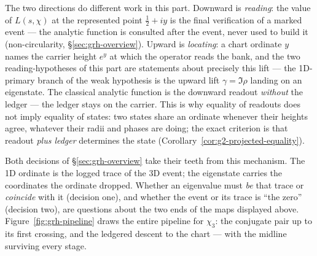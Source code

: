 The two directions do different work in this part. Downward is
\emph{reading}: the value of \(L(s,\chi)\) at the represented point
\(\tfrac12+iy\) is the final verification of a marked event --- the analytic
function is consulted after the event, never used to build it
(non-circularity, \S\ref{sec:grh-overview}). Upward is \emph{locating}: a
chart ordinate \(y\) names the carrier height \(e^{y}\) at which the operator
reads the bank, and the two reading-hypotheses of this part are statements
about precisely this lift --- the 1D-primary branch of the weak hypothesis is
the upward lift \(\gamma=\Im\rho\) landing on an eigenstate. The classical
analytic function is the downward readout \emph{without} the ledger --- the
ledger stays on the carrier. This is why equality of readouts does not imply
equality of states: two states share an ordinate whenever their heights
agree, whatever their radii and phases are doing; the exact criterion is that
readout \emph{plus ledger} determines the state
(Corollary~\ref{cor:g2-projected-equality}).

Both decisions of \S\ref{sec:grh-overview} take their teeth from this
mechanism. The 1D ordinate is the logged trace of the 3D event; the
eigenstate carries the coordinates the ordinate dropped. Whether an
eigenvalue must \emph{be} that trace or \emph{coincide} with it (decision
one), and whether the event or its trace is ``the zero'' (decision two), are
questions about the two ends of the maps displayed above.
Figure~\ref{fig:grh-pipeline} draws the entire pipeline for \(\chi_3\): the
conjugate pair up to its first crossing, and the ledgered descent to the
chart --- with the midline surviving every stage.

